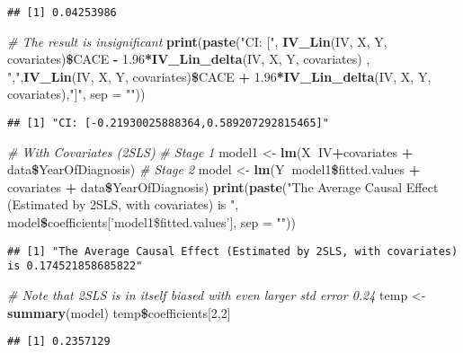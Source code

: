 \documentclass[]{article}
\newenvironment{Shaded}{\begin{snugshade}}{\end{snugshade}}
\newcommand{\KeywordTok}[1]{\textcolor[rgb]{0.13,0.29,0.53}{\textbf{#1}}}
\newcommand{\DataTypeTok}[1]{\textcolor[rgb]{0.13,0.29,0.53}{#1}}
\newcommand{\DecValTok}[1]{\textcolor[rgb]{0.00,0.00,0.81}{#1}}
\newcommand{\FloatTok}[1]{\textcolor[rgb]{0.00,0.00,0.81}{#1}}
\newcommand{\StringTok}[1]{\textcolor[rgb]{0.31,0.60,0.02}{#1}}
\newcommand{\CommentTok}[1]{\textcolor[rgb]{0.56,0.35,0.01}{\textit{#1}}}
\newcommand{\OperatorTok}[1]{\textcolor[rgb]{0.81,0.36,0.00}{\textbf{#1}}}
\newcommand{\NormalTok}[1]{#1}
\begin{document}
\begin{verbatim}
## [1] 0.04253986
\end{verbatim}

\begin{Shaded}
\begin{Highlighting}[]
\CommentTok{# The result is insignificant}
\KeywordTok{print}\NormalTok{(}\KeywordTok{paste}\NormalTok{(}\StringTok{"CI: ["}\NormalTok{, }\KeywordTok{IV_Lin}\NormalTok{(IV, X, Y, covariates)}\OperatorTok{\$}\NormalTok{CACE }\OperatorTok{-}\StringTok{ }\FloatTok{1.96}\OperatorTok{*}\KeywordTok{IV_Lin_delta}\NormalTok{(IV, X, Y, covariates) , }\StringTok{","}\NormalTok{,}\KeywordTok{IV_Lin}\NormalTok{(IV, X, Y, covariates)}\OperatorTok{\$}\NormalTok{CACE }\OperatorTok{+}\StringTok{ }\FloatTok{1.96}\OperatorTok{*}\KeywordTok{IV_Lin_delta}\NormalTok{(IV, X, Y, covariates),}\StringTok{"]"}\NormalTok{, }\DataTypeTok{sep =} \StringTok{""}\NormalTok{))}
\end{Highlighting}
\end{Shaded}

\begin{verbatim}
## [1] "CI: [-0.21930025888364,0.589207292815465]"
\end{verbatim}

\begin{Shaded}
\begin{Highlighting}[]
\CommentTok{# With Covariates (2SLS)}
\CommentTok{# Stage 1}
\NormalTok{model1 <-}\StringTok{ }\KeywordTok{lm}\NormalTok{(X}\OperatorTok{~}\NormalTok{IV}\OperatorTok{+}\NormalTok{covariates }\OperatorTok{+}\StringTok{ }\NormalTok{data}\OperatorTok{\$}\NormalTok{YearOfDiagnosis)}
\CommentTok{# Stage 2}
\NormalTok{model <-}\StringTok{ }\KeywordTok{lm}\NormalTok{(Y}\OperatorTok{~}\NormalTok{model1}\OperatorTok{\$}\NormalTok{fitted.values }\OperatorTok{+}\StringTok{ }\NormalTok{covariates }\OperatorTok{+}\StringTok{ }\NormalTok{data}\OperatorTok{\$}\NormalTok{YearOfDiagnosis)}
\KeywordTok{print}\NormalTok{(}\KeywordTok{paste}\NormalTok{(}\StringTok{"The Average Causal Effect (Estimated by 2SLS, with covariates) is "}\NormalTok{, model}\OperatorTok{\$}\NormalTok{coefficients[}\StringTok{'model1\$fitted.values'}\NormalTok{], }\DataTypeTok{sep =} \StringTok{""}\NormalTok{))}
\end{Highlighting}
\end{Shaded}

\begin{verbatim}
## [1] "The Average Causal Effect (Estimated by 2SLS, with covariates) is 0.174521858685822"
\end{verbatim}

\begin{Shaded}
\begin{Highlighting}[]
\CommentTok{# Note that 2SLS is in itself biased with even larger std error 0.24}
\NormalTok{temp <-}\StringTok{ }\KeywordTok{summary}\NormalTok{(model)}
\NormalTok{temp}\OperatorTok{\$}\NormalTok{coefficients[}\DecValTok{2}\NormalTok{,}\DecValTok{2}\NormalTok{]}
\end{Highlighting}
\end{Shaded}

\begin{verbatim}
## [1] 0.2357129
\end{verbatim}
\end{document}
